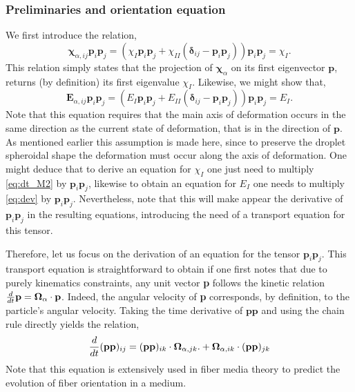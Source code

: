 \subsubsection{Preliminaries and orientation equation}
We first introduce the relation,
\begin{equation}
    \bm\chi_{\alpha,ij} \textbf{p}_i\textbf{p}_j
    = 
    (
        \chi_I \textbf{p}_i\textbf{p}_j
        + \chi_{II} (\bm\delta_{ij} - \textbf{p}_i\textbf{p}_j)
    ) \textbf{p}_i\textbf{p}_j
    = \chi_I.
    \label{eq:chi_I_def}
\end{equation} 
This relation simply states that the projection of $\bm\chi_\alpha$ on its first eigenvector $\textbf{p}$, returns (by definition) its first eigenvalue $\chi_I$. 
Likewise, we might show that, 
\begin{equation}
    \textbf{E}_{\alpha,ij} \textbf{p}_i\textbf{p}_j
    = 
    (
        E_I \textbf{p}_i\textbf{p}_j
        + E_{II} (\bm\delta_{ij} - \textbf{p}_i\textbf{p}_j)
    ) \textbf{p}_i\textbf{p}_j
    = E_I.
    \label{eq:E_I_def}
\end{equation} 
Note that this equation requires that the main axis of deformation occurs in the same direction as the current state of deformation, that is in the direction of $\textbf{p}$. 
As mentioned earlier this assumption is made here, since to preserve the droplet spheroidal shape the deformation must occur along the axis of deformation. 
One might deduce that to derive an equation for $\chi_I$ one just need to multiply \ref{eq:dt_M2} by $\textbf{p}_i \textbf{p}_j$, likewise to obtain an equation for $E_I$ one needs to multiply \ref{eq:dev} by $\textbf{p}_i \textbf{p}_j$. 
Nevertheless, note that this will make appear the derivative of $\textbf{p}_i \textbf{p}_j$ in the resulting equations, introducing the need of a transport equation for this tensor. 

Therefore, let us focus on the derivation of an equation for the tensor  $\textbf{p}_i \textbf{p}_j$. 
This transport equation is straightforward to obtain if one first notes that due to purely kinematics   constraints, any unit vector \textbf{p} follows the kinetic relation $\frac{d}{dt} \textbf{p} = \bm\Omega_\alpha \cdot \textbf{p}$.
Indeed, the angular velocity of \textbf{p} corresponds, by definition, to the particle's angular velocity. 
Taking the time derivative of $\textbf{pp}$ and using the chain rule directly yields the relation, 
\begin{equation}
    \ddt (\textbf{pp})_{ij}
    = 
    (\textbf{pp})_{ik}\cdot\bm\Omega_{\alpha,jk}. 
    +\bm\Omega_{\alpha,ik}\cdot (\textbf{pp})_{jk}
    \label{eq:dt_pp}
\end{equation}
Note that this equation is extensively used in fiber media theory to predict the evolution of fiber orientation in a medium. 

